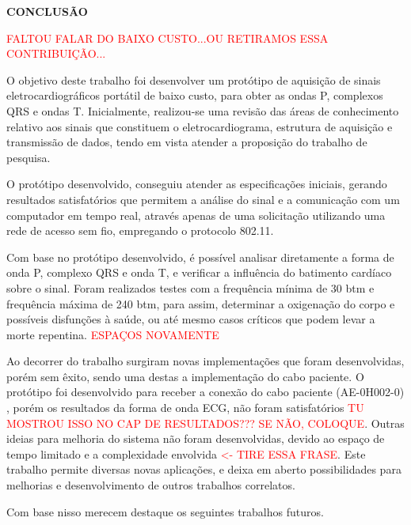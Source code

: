 \documentclass[12pt, a4paper]{article}
\begin{document}
\newpage
\vspace*{4cm}
\begin{center}
\textbf{CONCLUSÃO}
\end{center}
\vspace{48pt}

\textcolor{red}{FALTOU FALAR DO BAIXO CUSTO...OU RETIRAMOS ESSA CONTRIBUIÇÃO...}



\hspace*{0.8cm}O objetivo deste trabalho foi desenvolver um  protótipo de aquisição de sinais eletrocardiográficos portátil de baixo custo, para obter as ondas P, complexos QRS e ondas T. Inicialmente, realizou-se uma revisão das áreas de conhecimento relativo aos sinais que constituem o eletrocardiograma, estrutura de aquisição e transmissão de dados, tendo em vista atender a proposição do trabalho de pesquisa.

O protótipo desenvolvido, conseguiu atender as especificações iniciais, gerando resultados satisfatórios que permitem a análise do sinal e a comunicação com um computador em tempo real, através apenas de uma solicitação utilizando uma rede de acesso sem fio, empregando o protocolo 802.11.

Com base no protótipo desenvolvido, é possível analisar diretamente a forma de onda P, complexo QRS e onda T, e verificar a influência do batimento cardíaco sobre o sinal. Foram realizados testes com a frequência mínima de 30 btm e frequência máxima de 240 btm, para assim,  determinar a oxigenação do corpo e possíveis disfunções à saúde, ou até mesmo casos críticos que podem levar a morte repentina. \textcolor{red}{ESPAÇOS NOVAMENTE}

Ao decorrer do trabalho surgiram novas implementações que  foram desenvolvidas, porém sem êxito, sendo uma destas a implementação do cabo paciente. O protótipo foi desenvolvido para receber a conexão do cabo paciente (AE-0H002-0) , porém os resultados da forma de onda ECG, não foram satisfatórios \textcolor{red}{TU MOSTROU ISSO NO CAP DE RESULTADOS??? SE NÃO, COLOQUE}. Outras ideias para melhoria do sistema não foram desenvolvidas, devido ao espaço de tempo limitado e a complexidade envolvida \textcolor{red}{<- TIRE ESSA FRASE}. Este trabalho permite diversas novas aplicações, e deixa em aberto possibilidades para melhorias e  desenvolvimento de outros trabalhos correlatos.

Com base nisso merecem destaque os seguintes trabalhos futuros.
\end{document}
